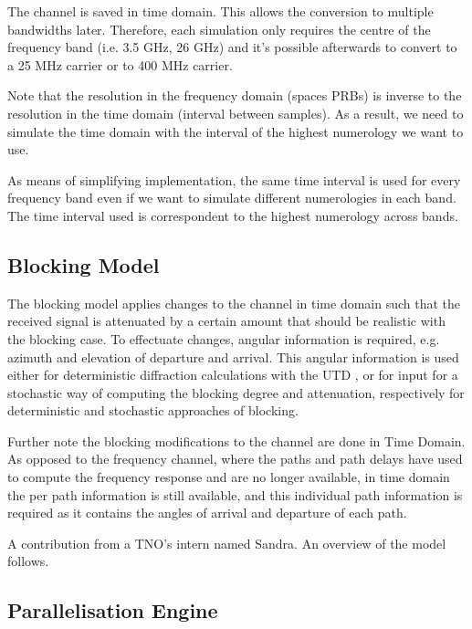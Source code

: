 The channel is saved in time domain. This allows the conversion to multiple bandwidths later. Therefore, each simulation only requires the centre of the frequency band (i.e. 3.5 GHz, 26 GHz) and it's possible afterwards to convert to a 25 MHz carrier or to 400 MHz carrier. 

Note that the resolution in the frequency domain (spaces \acsp{PRB}) is inverse to the resolution in the time domain (interval between samples). As a result, we need to simulate the time domain with the interval of the highest numerology we want to use.

As means of simplifying implementation, the same time interval is used for every frequency band even if we want to simulate different numerologies in each band. The time interval used is correspondent to the highest numerology across bands.



\subsection{Blocking Model}

The blocking model applies changes to the channel in time domain such that the received signal is attenuated by a certain amount that should be realistic with the blocking case. 
To effectuate changes, angular information is required, e.g. azimuth and elevation of departure and arrival. This angular information is used either for deterministic diffraction calculations with the \ac{UTD} \cite{UTD}, or for input for a stochastic way of computing the blocking degree and attenuation, respectively for deterministic and stochastic approaches of blocking.

Further note the blocking modifications to the channel are done in Time Domain. As opposed to the frequency channel, where the paths and path delays have used to compute the frequency response and are no longer available, in time domain the per path information is still available, and this individual path information is required as it contains the angles of arrival and departure of each path.

A contribution from a TNO's intern named Sandra. An overview of the model follows.



\subsection{Parallelisation Engine}

